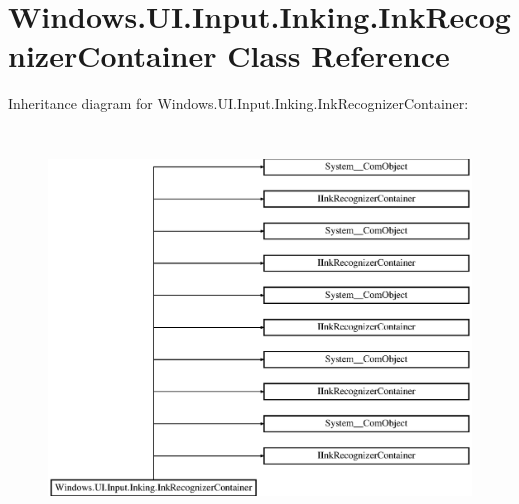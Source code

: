 \hypertarget{class_windows_1_1_u_i_1_1_input_1_1_inking_1_1_ink_recognizer_container}{}\section{Windows.\+U\+I.\+Input.\+Inking.\+Ink\+Recognizer\+Container Class Reference}
\label{class_windows_1_1_u_i_1_1_input_1_1_inking_1_1_ink_recognizer_container}
Inheritance diagram for Windows.\+U\+I.\+Input.\+Inking.\+Ink\+Recognizer\+Container\+:\begin{figure}[H]
\begin{center}
\leavevmode
\includegraphics[height=10.547945cm]{class_windows_1_1_u_i_1_1_input_1_1_inking_1_1_ink_recognizer_container}
\end{center}
\end{figure}
